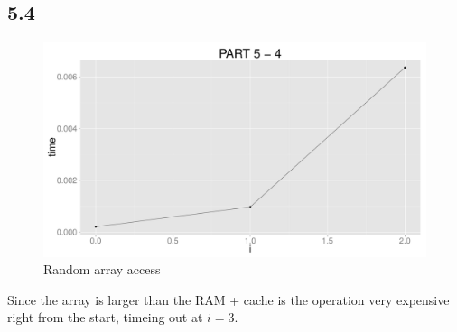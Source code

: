 \documentclass{article}
\begin{document}
\subsection*{5.4}
\begin{figure}[H]
    \centering
    \includegraphics[width=\textwidth]{images/part5_4.pdf}
    \caption{Random array access}
    \label{fig:awesome_image}
\end{figure}
Since the array is larger than the RAM + cache is the 
operation very expensive right from the start, timeing out at $i = 3$. 
%
\end{document}
